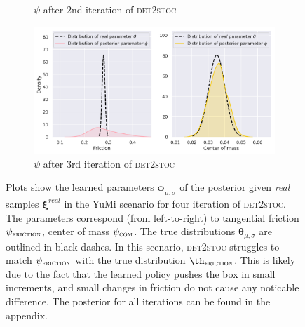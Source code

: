 \documentclass{kththesis}
\newcommand{\vth}{\boldsymbol{\theta}}
\newcommand{\vph}{\boldsymbol{\phi}}
\renewcommand{\vec}[1]{\boldsymbol{#1}}
\newcommand{\dettostoc}{\textsc{det2stoc}}
\newcommand{\pfriction}{\psi_{\textsc{friction}}}
\newcommand{\pcom}{\psi_{\textsc{com}}}
\begin{document}
\begin{figure}
\begin{subfigure}{0.45\textwidth}
  \caption{$\psi$ after 2nd iteration of \dettostoc{}}
\end{subfigure}
\begin{subfigure}{0.45\textwidth}
  \centering
  \includegraphics[width=\linewidth]{img/yumi/latent-representation/yumi_latent_encoding_3_iter}
  \caption{$\psi$ after 3rd iteration of \dettostoc{}}
\end{subfigure}
\caption{Plots show the learned parameters $\vph_{\mu, \sigma}$ of the posterior given \emph{real} samples $\vec{\xi}^{real}$ in the YuMi scenario for four iteration of \dettostoc{}.
The parameters correspond (from left-to-right) to tangential friction $\pfriction$, center of mass $\pcom$. The true distributions $\vth_{\mu, \sigma}$ are outlined in black dashes. In this scenario, \dettostoc{} struggles to match $\pfriction{}$ with the true distribution $\th_\textsc{friction}$. This is likely due to the fact that the learned policy pushes the box in small increments, and small changes in friction do not cause any noticable difference. The posterior for all iterations can be found in the appendix.}
\label{fig:yumi_latent_space_full}
\end{figure}
\end{document}
